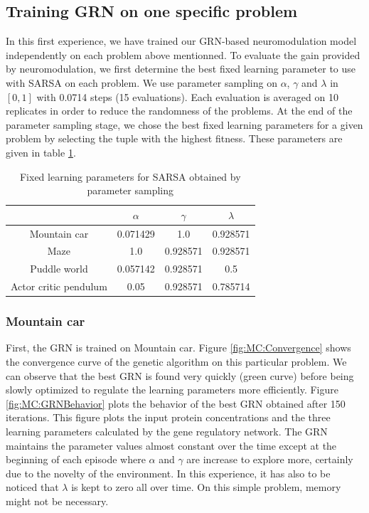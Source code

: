 \subsection{Training GRN on one specific problem}
In this first experience, we have trained our GRN-based neuromodulation model independently on each problem above mentionned. To evaluate the gain provided by neuromodulation, we first determine the best fixed learning parameter to use with SARSA on each problem. We use parameter sampling on $\alpha$, $\gamma$ and $\lambda$ in $[0, 1]$ with 0.0714 steps (15 evaluations). Each evaluation is averaged on 10 replicates in order to reduce the randomness of the problems. At the end of the parameter sampling stage, we chose the best fixed learning parameters for a given problem by selecting the tuple with the highest fitness. These parameters are given in table \ref{tab:SARSAFixedParams}.

\begin{table}
\begin{tabular}{c|ccc}
					& $\alpha$	& $\gamma$	& $\lambda$	\\\hline
Mountain car			& 0.071429	& 1.0		& 0.928571 	\\%
Maze				& 1.0		& 0.928571	& 0.928571	\\%
Puddle world			&  0.057142	& 0.928571	& 0.5		\\%
Actor critic pendulum	& 0.05		& 0.928571	& 0.785714	\\%
\end{tabular}
\caption{Fixed learning parameters for SARSA obtained by parameter sampling}\label{tab:SARSAFixedParams}
\end{table}

\subsubsection{Mountain car}
First, the GRN is trained on Mountain car. Figure \ref{fig:MC:Convergence} shows the convergence curve of the genetic algorithm on this particular problem. We can observe that the best GRN is found very quickly (green curve) before being slowly optimized to regulate the learning parameters more efficiently. Figure \ref{fig:MC:GRNBehavior} plots the behavior of the best GRN obtained after 150 iterations. This figure plots the input protein concentrations and the three learning parameters calculated by the gene regulatory network. The GRN maintains the parameter values almost constant over the time except at the beginning of each episode where $\alpha$ and $\gamma$ are increase to explore more, certainly due to the novelty of the environment. In this experience, it has also to be noticed that $\lambda$ is kept to zero all over time. On this simple problem, memory might not be necessary. 

